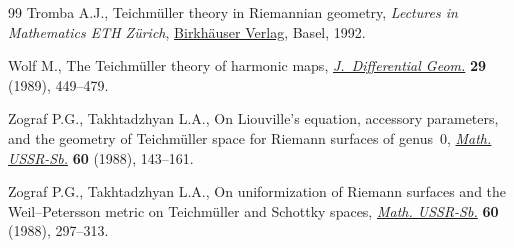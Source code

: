 \begin{thebibliography}{99}
Tromba A.J., Teichm\"uller theory in {R}iemannian geometry, \textit{Lectures in
 Mathematics ETH Z\"urich}, \href{https://doi.org/10.1007/978-3-0348-8613-0}{Birkh\"auser Verlag}, Basel, 1992.

Wolf M., The {T}eichm\"uller theory of harmonic maps, \href{https://doi.org/10.4310/jdg/1214442885}{\textit{J.~Differential
 Geom.}} \textbf{29} (1989), 449--479.

Zograf P.G., Takhtadzhyan L.A., On {L}iouville's equation, accessory parameters, and the geometry of {T}eich\-m\"uller space for {R}iemann surfaces of genus~$0$, \href{https://doi.org/10.1070/SM1988v060n01ABEH003160}{\textit{Math. USSR-Sb.}} \textbf{60} (1988), 143--161.

Zograf P.G., Takhtadzhyan L.A., On uniformization of {R}iemann surfaces and the {W}eil--{P}etersson metric on {T}eichm\"uller and {S}chottky spaces, \href{https://doi.org/10.1070/SM1988v060n02ABEH003170}{\textit{Math. USSR-Sb.}} \textbf{60} (1988), 297--313.

\end{thebibliography}
